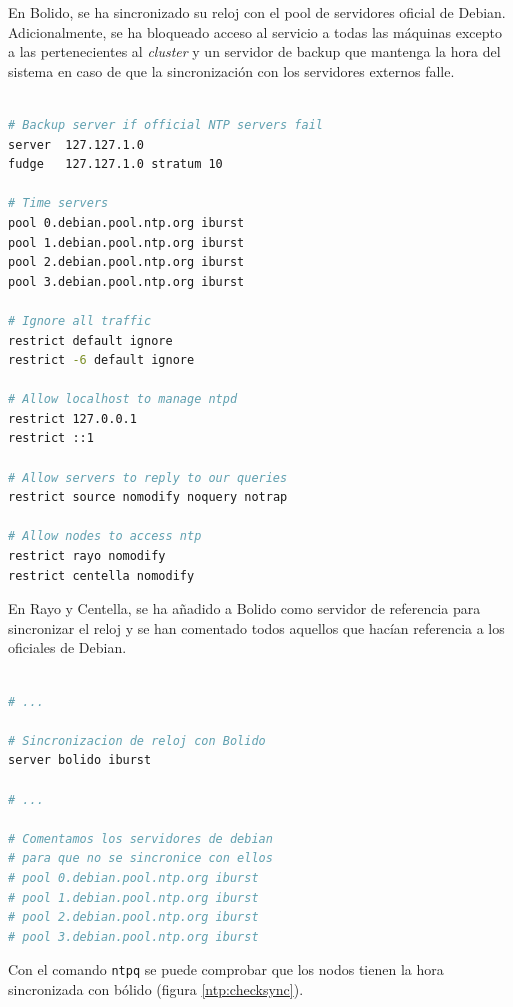 En Bolido, se ha sincronizado su reloj con el pool de servidores oficial de Debian. Adicionalmente, se ha bloqueado acceso al servicio a todas las máquinas excepto a las pertenecientes al \emph{cluster} y un servidor de backup que mantenga la hora del sistema en caso de que la sincronización con los servidores externos falle. 
\vspace{4mm}

\begin{lstlisting}[language=bash,caption={Fichero /etc/ntp.conf de Bolido},xleftmargin=.25\textwidth]

# Backup server if official NTP servers fail
server  127.127.1.0
fudge   127.127.1.0 stratum 10

# Time servers
pool 0.debian.pool.ntp.org iburst
pool 1.debian.pool.ntp.org iburst
pool 2.debian.pool.ntp.org iburst
pool 3.debian.pool.ntp.org iburst

# Ignore all traffic
restrict default ignore
restrict -6 default ignore

# Allow localhost to manage ntpd
restrict 127.0.0.1
restrict ::1

# Allow servers to reply to our queries
restrict source nomodify noquery notrap

# Allow nodes to access ntp
restrict rayo nomodify
restrict centella nomodify
\end{lstlisting} 
\vspace{4mm}

En Rayo y Centella, se ha añadido a Bolido como servidor de referencia para sincronizar el reloj y se han comentado todos aquellos que hacían referencia a los oficiales de Debian.
\vspace{2mm}

\begin{lstlisting}[language=bash,caption={Fichero /etc/ntp.conf de Bolido},xleftmargin=.25\textwidth]

# ...

# Sincronizacion de reloj con Bolido
server bolido iburst

# ...

# Comentamos los servidores de debian 
# para que no se sincronice con ellos
# pool 0.debian.pool.ntp.org iburst
# pool 1.debian.pool.ntp.org iburst
# pool 2.debian.pool.ntp.org iburst
# pool 3.debian.pool.ntp.org iburst
\end{lstlisting}
\vspace{4mm}

Con el comando \lstinline[language=bash]!ntpq! se puede comprobar que los nodos tienen la hora sincronizada con bólido (figura \ref{ntp:checksync}).


